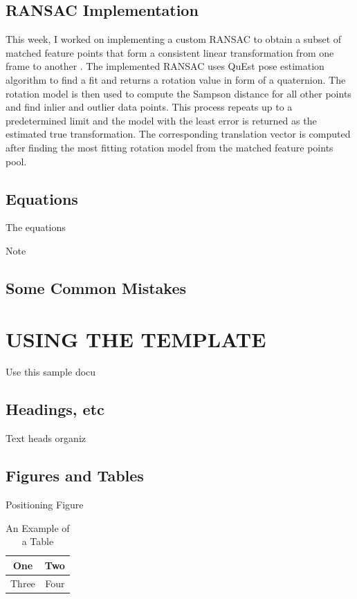 \documentclass[letterpaper, 10 pt, conference]{ieeeconf}  %
\begin{document}
\subsection{RANSAC Implementation}
This week, I worked on implementing
a custom RANSAC to obtain a subset of matched feature points that form
a consistent linear transformation from one frame to another
\cite{shi2013sift}. The implemented RANSAC uses QuEst pose estimation
algorithm to find a fit and returns a rotation value in form of a
quaternion. The rotation model is then used to compute the Sampson distance
for all other points and find inlier and outlier data points. This process
repeats up to a predetermined limit and the model with the least error is
returned as the estimated true transformation. The corresponding translation
vector is computed after finding the most fitting rotation model from the
matched feature points pool.



\subsection{Equations}

The equations



Note

\subsection{Some Common Mistakes}

\section{USING THE TEMPLATE}

Use this sample docu

\subsection{Headings, etc}

Text heads organiz

\subsection{Figures and Tables}

Positioning Figure



\begin{table}[h]
\caption{An Example of a Table}
\label{table_example}
\begin{center}
\begin{tabular}{|c||c|}
\hline
One & Two\\
\hline
Three & Four\\
\hline
\end{tabular}
\end{center}
\end{table}
\end{document}
